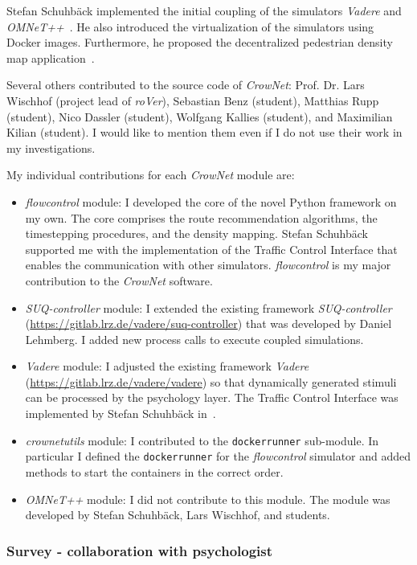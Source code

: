 Stefan Schuhbäck implemented the initial coupling of the simulators \textit{Vadere} and \textit{OMNeT++}~\cite{schuhbaeck-2019-com}. He also introduced the virtualization of the simulators using Docker images. Furthermore, he proposed the decentralized pedestrian density map application~\cite{schuhbaeck-2021-com,schuhbaeck-2023-com}. 

Several others contributed to the source code of \textit{CrowNet}: Prof. Dr. Lars Wischhof (project lead of \textit{roVer}), Sebastian Benz (student), Matthias Rupp (student), Nico Dassler (student), Wolfgang Kallies (student), and Maximilian Kilian (student). I would like to mention them even if I do not use their work in my investigations.

My individual contributions for each \textit{CrowNet} module are: 

\begin{itemize}
\item \textit{flowcontrol} module: I developed the core of the novel Python framework on my own. The core comprises the route recommendation algorithms, the timestepping procedures, and the density mapping. Stefan Schuhbäck supported me with the implementation of the Traffic Control Interface that enables the communication with other simulators. \textit{flowcontrol} is my major contribution to the \textit{CrowNet} software.
\item \textit{SUQ-controller} module: I extended the existing framework \textit{SUQ-controller} (\url{https://gitlab.lrz.de/vadere/suq-controller}) that was developed by Daniel Lehmberg. I added new process calls to execute coupled simulations. 
\item \textit{Vadere} module: I adjusted the existing framework \textit{Vadere} (\url{https://gitlab.lrz.de/vadere/vadere}) so that dynamically generated stimuli can be processed by the psychology layer. The Traffic Control Interface was implemented by Stefan Schuhbäck in~\cite{schuhbaeck-2019-com}.
\item \textit{crownetutils} module: I contributed to the \lstinline{dockerrunner} sub-module. In particular I defined the \lstinline{dockerrunner} for the \textit{flowcontrol} simulator and added methods to start the containers in the correct order.
\item \textit{OMNeT++} module: I did not contribute to this module. The module was developed by Stefan Schuhbäck, Lars Wischhof, and students. 
\end{itemize}
 
\subsubsection{Survey - collaboration with psychologist}

